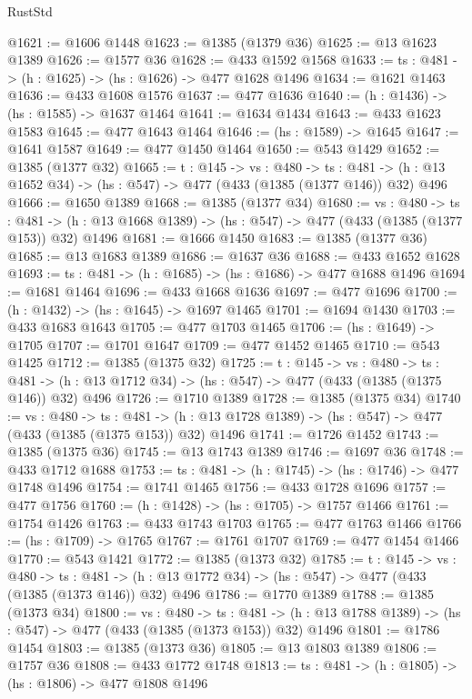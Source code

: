 \begin{lexlean}{RustStd}
\begin{coremodule}
@1621 := @1606 @1448
@1623 := @1385 (@1379 @36)
@1625 := @13 @1623 @1389
@1626 := @1577 @36
@1628 := @433 @1592 @1568
@1633 := {ts : @481} -> (h : @1625) -> (hs : @1626) -> @477 @1628 @1496
@1634 := @1621 @1463
@1636 := @433 @1608 @1576
@1637 := @477 @1636
@1640 := (h : @1436) -> (hs : @1585) -> @1637 @1464
@1641 := @1634 @1434
@1643 := @433 @1623 @1583
@1645 := @477 @1643 @1464
@1646 := (hs : @1589) -> @1645
@1647 := @1641 @1587
@1649 := @477 @1450 @1464
@1650 := @543 @1429
@1652 := @1385 (@1377 @32)
@1665 := {t : @145} ->
  {vs : @480} ->
  {ts : @481} -> (h : @13 @1652 @34) -> (hs : @547) -> @477 (@433 (@1385 (@1377 @146)) @32) @496
@1666 := @1650 @1389
@1668 := @1385 (@1377 @34)
@1680 := {vs : @480} ->
  {ts : @481} -> (h : @13 @1668 @1389) -> (hs : @547) -> @477 (@433 (@1385 (@1377 @153)) @32) @1496
@1681 := @1666 @1450
@1683 := @1385 (@1377 @36)
@1685 := @13 @1683 @1389
@1686 := @1637 @36
@1688 := @433 @1652 @1628
@1693 := {ts : @481} -> (h : @1685) -> (hs : @1686) -> @477 @1688 @1496
@1694 := @1681 @1464
@1696 := @433 @1668 @1636
@1697 := @477 @1696
@1700 := (h : @1432) -> (hs : @1645) -> @1697 @1465
@1701 := @1694 @1430
@1703 := @433 @1683 @1643
@1705 := @477 @1703 @1465
@1706 := (hs : @1649) -> @1705
@1707 := @1701 @1647
@1709 := @477 @1452 @1465
@1710 := @543 @1425
@1712 := @1385 (@1375 @32)
@1725 := {t : @145} ->
  {vs : @480} ->
  {ts : @481} -> (h : @13 @1712 @34) -> (hs : @547) -> @477 (@433 (@1385 (@1375 @146)) @32) @496
@1726 := @1710 @1389
@1728 := @1385 (@1375 @34)
@1740 := {vs : @480} ->
  {ts : @481} -> (h : @13 @1728 @1389) -> (hs : @547) -> @477 (@433 (@1385 (@1375 @153)) @32) @1496
@1741 := @1726 @1452
@1743 := @1385 (@1375 @36)
@1745 := @13 @1743 @1389
@1746 := @1697 @36
@1748 := @433 @1712 @1688
@1753 := {ts : @481} -> (h : @1745) -> (hs : @1746) -> @477 @1748 @1496
@1754 := @1741 @1465
@1756 := @433 @1728 @1696
@1757 := @477 @1756
@1760 := (h : @1428) -> (hs : @1705) -> @1757 @1466
@1761 := @1754 @1426
@1763 := @433 @1743 @1703
@1765 := @477 @1763 @1466
@1766 := (hs : @1709) -> @1765
@1767 := @1761 @1707
@1769 := @477 @1454 @1466
@1770 := @543 @1421
@1772 := @1385 (@1373 @32)
@1785 := {t : @145} ->
  {vs : @480} ->
  {ts : @481} -> (h : @13 @1772 @34) -> (hs : @547) -> @477 (@433 (@1385 (@1373 @146)) @32) @496
@1786 := @1770 @1389
@1788 := @1385 (@1373 @34)
@1800 := {vs : @480} ->
  {ts : @481} -> (h : @13 @1788 @1389) -> (hs : @547) -> @477 (@433 (@1385 (@1373 @153)) @32) @1496
@1801 := @1786 @1454
@1803 := @1385 (@1373 @36)
@1805 := @13 @1803 @1389
@1806 := @1757 @36
@1808 := @433 @1772 @1748
@1813 := {ts : @481} -> (h : @1805) -> (hs : @1806) -> @477 @1808 @1496

\end{coremodule}
\end{lexlean}
